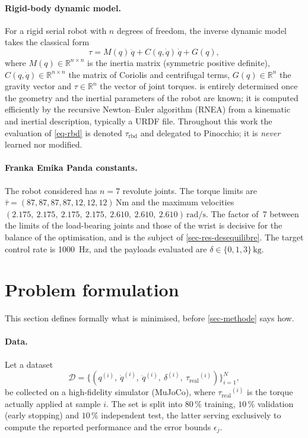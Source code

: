 \documentclass[a4paper, oneside]{article}
\newcommand{\q}{\ensuremath{q}}
\newcommand{\qd}{\ensuremath{\dot{q}}}
\newcommand{\qdd}{\ensuremath{\ddot{q}}}
\newcommand{\taurbd}{\ensuremath{\tau_{\mathrm{rbd}}}}
\newcommand{\taureal}{\ensuremath{\tau_{\mathrm{real}}}}
\newcommand{\Rset}{\ensuremath{\mathbb{R}}}
\newcommand{\Dset}{\ensuremath{\mathcal{D}}}
\begin{document}
\paragraph{Rigid-body dynamic model.}
For a rigid serial robot with $n$ degrees of freedom, the inverse dynamic model
takes the classical form
%
\begin{equation}
    \tau = M(\q)\,\qdd + C(\q,\qd)\,\qd + G(\q) ,
    \label{eq-rbd}
\end{equation}
%
where $M(\q) \in \Rset^{n \times n}$ is the inertia matrix (symmetric positive
definite), $C(\q,\qd) \in \Rset^{n \times n}$ the matrix of Coriolis and
centrifugal terms, $G(\q) \in \Rset^{n}$ the gravity vector and
$\tau \in \Rset^{n}$ the vector of joint torques.
 is entirely determined once the geometry and the inertial
parameters of the robot are known; it is computed efficiently by the recursive
Newton--Euler algorithm (RNEA) from a kinematic and inertial description,
typically a URDF file. Throughout this work the evaluation of \cref{eq-rbd} is
denoted $\taurbd$ and delegated to Pinocchio; it is \emph{never} learned nor
modified.

\paragraph{Franka Emika Panda constants.}
The robot considered has $n = 7$ revolute joints. The torque limits are
$\bar{\tau} = (87, 87, 87, 87, 12, 12, 12)\,\si{\newton\meter}$ and the maximum
velocities $(2.175,\ 2.175,\ 2.175,\ 2.175,\ 2.610,\ 2.610,\
2.610)\,\si{\radian\per\second}$. The factor of~7 between the limits of the
load-bearing joints and those of the wrist is decisive for the balance of the
optimisation, and is the subject of \cref{sec-res-desequilibre}. The target
control rate is \SI{1000}{\hertz}, and the payloads evaluated are
$\delta \in \{0, 1, 3\}\,\si{\kilogram}$.

\section{Problem formulation}
\label{sec-probleme}

This section defines formally what is minimised, before \cref{sec-methode} says
how.

\paragraph{Data.}
Let a dataset
%
\begin{equation}
    \Dset = \bigl\{ (\q^{(i)},\ \qd^{(i)},\ \qdd^{(i)},\ \delta^{(i)},\
    \taureal^{(i)}) \bigr\}_{i=1}^{N} ,
    \label{eq-dataset}
\end{equation}
%
be collected on a high-fidelity simulator (MuJoCo), where $\taureal^{(i)}$
is the torque actually applied at sample $i$. The set is split into
$80\,\%$ training, $10\,\%$ validation (early stopping) and $10\,\%$
independent test, the latter serving exclusively to compute the reported
performance and the error bounds $\epsilon_j$.
\end{document}
